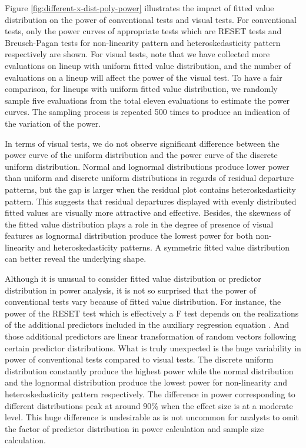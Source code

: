 \documentclass[]{interact}
\theoremstyle{plain}%
\theoremstyle{definition}
\theoremstyle{remark}
\begin{document}
Figure \ref{fig:different-x-dist-poly-power} illustrates the impact of
fitted value distribution on the power of conventional tests and visual
tests. For conventional tests, only the power curves of appropriate
tests which are RESET tests and Breusch-Pagan tests for non-linearity
pattern and heteroskedasticity pattern respectively are shown. For
visual tests, note that we have collected more evaluations on lineup
with uniform fitted value distribution, and the number of evaluations on
a lineup will affect the power of the visual test. To have a fair
comparison, for lineups with uniform fitted value distribution, we
randomly sample five evaluations from the total eleven evaluations to
estimate the power curves. The sampling process is repeated 500 times to
produce an indication of the variation of the power.

In terms of visual tests, we do not observe significant difference
between the power curve of the uniform distribution and the power curve
of the discrete uniform distribution. Normal and lognormal distributions
produce lower power than uniform and discrete uniform distributions in
regards of residual departure patterns, but the gap is larger when the
residual plot contains heteroskedasticity pattern. This suggests that
residual departures displayed with evenly distributed fitted values are
visually more attractive and effective. Besides, the skewness of the
fitted value distribution plays a role in the degree of presence of
visual features as lognormal distribution produce the lowest power for
both non-linearity and heteroskedasticity patterns. A symmetric fitted
value distribution can better reveal the underlying shape.

Although it is unusual to consider fitted value distribution or
predictor distribution in power analysis, it is not so surprised that
the power of conventional tests vary because of fitted value
distribution. For instance, the power of the RESET test which is
effectively a F test depends on the realizations of the additional
predictors included in the auxiliary regression equation
\citep{jamshidian2007study, olvera2019relationship, zhang2018practical}.
And those additional predictors are linear transformation of random
vectors following certain predictor distributions. What is truly
unexpected is the huge variability in power of conventional tests
compared to visual tests. The discrete uniform distribution constantly
produce the highest power while the normal distribution and the
lognormal distribution produce the lowest power for non-linearity and
heteroskedasticity pattern respectively. The difference in power
corresponding to different distributions peak at around 90\% when the
effect size is at a moderate level. This huge difference is undesirable
as is not uncommon for analysts to omit the factor of predictor
distribution in power calculation and sample size calculation.
\end{document}
